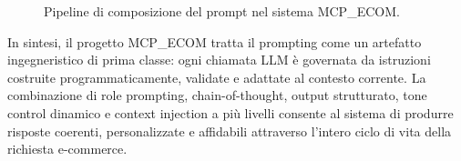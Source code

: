 \begin{figure}[htbp]
    \centering
    \caption{Pipeline di composizione del prompt nel sistema MCP\_ECOM.}
    \label{fig:prompt-pipeline}
\end{figure}

In sintesi, il progetto MCP\_ECOM tratta il prompting come un artefatto
ingegneristico di prima classe: ogni chiamata LLM è governata da istruzioni
costruite programmaticamente, validate e adattate al contesto corrente.
La combinazione di role prompting, chain-of-thought, output strutturato,
tone control dinamico e context injection a più livelli consente al sistema
di produrre risposte coerenti, personalizzate e affidabili attraverso
l'intero ciclo di vita della richiesta e-commerce.
